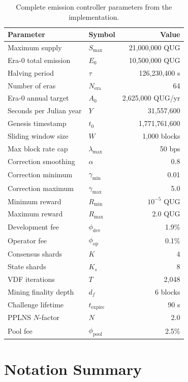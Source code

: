 \documentclass[11pt,a4paper]{article}
\theoremstyle{definition}
\theoremstyle{remark}
\newcommand{\QUG}{\textsf{QUG}}
\newcommand{\blockrate}{\lambda}
\begin{document}
\begin{table}[H]
\centering
\caption{Complete emission controller parameters from the implementation.}
\label{tab:emission-params}
\begin{tabular}{@{}llr@{}}
\toprule
\textbf{Parameter} & \textbf{Symbol} & \textbf{Value} \\
\midrule
Maximum supply & $S_{\max}$ & 21{,}000{,}000 \QUG{} \\
Era-0 total emission & $E_0$ & 10{,}500{,}000 \QUG{} \\
Halving period & $\tau$ & 126{,}230{,}400 s \\
Number of eras & $N_{\text{era}}$ & 64 \\
Era-0 annual target & $A_0$ & 2{,}625{,}000 \QUG{}/yr \\
Seconds per Julian year & $Y$ & 31{,}557{,}600 \\
Genesis timestamp & $t_0$ & 1{,}771{,}761{,}600 \\
Sliding window size & $W$ & 1{,}000 blocks \\
Max block rate cap & $\blockrate_{\max}$ & 50 bps \\
Correction smoothing & $\alpha$ & 0.8 \\
Correction minimum & $\gamma_{\min}$ & 0.01 \\
Correction maximum & $\gamma_{\max}$ & 5.0 \\
Minimum reward & $R_{\min}$ & $10^{-5}$ \QUG{} \\
Maximum reward & $R_{\max}$ & 2.0 \QUG{} \\
Development fee & $\phi_{\text{dev}}$ & 1.9\% \\
Operator fee & $\phi_{\text{op}}$ & 0.1\% \\
Consensus shards & $K$ & 4 \\
State shards & $K_s$ & 8 \\
VDF iterations & $T$ & 2{,}048 \\
Mining finality depth & $d_f$ & 6 blocks \\
Challenge lifetime & $t_{\text{expire}}$ & 90 s \\
PPLNS $N$-factor & $N$ & 2.0 \\
Pool fee & $\phi_{\text{pool}}$ & 2.5\% \\
\bottomrule
\end{tabular}
\end{table}

\section{Notation Summary}\label{app:notation}
\end{document}
